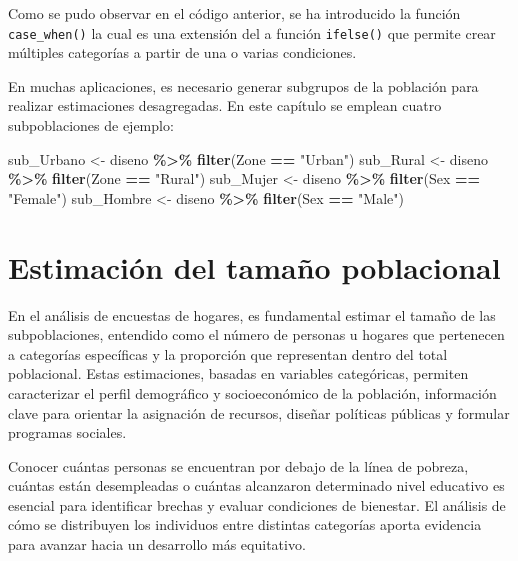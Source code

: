 \documentclass[
  spanish,
  12pt,
]{book}
\newenvironment{Shaded}{\begin{snugshade}}{\end{snugshade}}
\newcommand{\FunctionTok}[1]{\textcolor[rgb]{0.13,0.29,0.53}{\textbf{#1}}}
\newcommand{\NormalTok}[1]{#1}
\newcommand{\OtherTok}[1]{\textcolor[rgb]{0.56,0.35,0.01}{#1}}
\newcommand{\SpecialCharTok}[1]{\textcolor[rgb]{0.81,0.36,0.00}{\textbf{#1}}}
\newcommand{\StringTok}[1]{\textcolor[rgb]{0.31,0.60,0.02}{#1}}
\begin{document}
Como se pudo observar en el código anterior, se ha introducido la función \texttt{case\_when()} la cual es una extensión del a función \texttt{ifelse()} que permite crear múltiples categorías a partir de una o varias condiciones.

En muchas aplicaciones, es necesario generar subgrupos de la población para realizar estimaciones desagregadas. En este capítulo se emplean cuatro subpoblaciones de ejemplo:

\begin{Shaded}
\begin{Highlighting}[]
\NormalTok{sub\_Urbano }\OtherTok{\textless{}{-}}\NormalTok{ diseno }\SpecialCharTok{\%\textgreater{}\%}  \FunctionTok{filter}\NormalTok{(Zone }\SpecialCharTok{==} \StringTok{"Urban"}\NormalTok{)}
\NormalTok{sub\_Rural  }\OtherTok{\textless{}{-}}\NormalTok{ diseno }\SpecialCharTok{\%\textgreater{}\%}  \FunctionTok{filter}\NormalTok{(Zone }\SpecialCharTok{==} \StringTok{"Rural"}\NormalTok{)}
\NormalTok{sub\_Mujer  }\OtherTok{\textless{}{-}}\NormalTok{ diseno }\SpecialCharTok{\%\textgreater{}\%}  \FunctionTok{filter}\NormalTok{(Sex }\SpecialCharTok{==} \StringTok{"Female"}\NormalTok{)}
\NormalTok{sub\_Hombre }\OtherTok{\textless{}{-}}\NormalTok{ diseno }\SpecialCharTok{\%\textgreater{}\%}  \FunctionTok{filter}\NormalTok{(Sex }\SpecialCharTok{==} \StringTok{"Male"}\NormalTok{)}
\end{Highlighting}
\end{Shaded}

\section{Estimación del tamaño poblacional}\label{estimaciuxf3n-del-tamauxf1o-poblacional}

En el análisis de encuestas de hogares, es fundamental estimar el tamaño de las subpoblaciones, entendido como el número de personas u hogares que pertenecen a categorías específicas y la proporción que representan dentro del total poblacional. Estas estimaciones, basadas en variables categóricas, permiten caracterizar el perfil demográfico y socioeconómico de la población, información clave para orientar la asignación de recursos, diseñar políticas públicas y formular programas sociales.

Conocer cuántas personas se encuentran por debajo de la línea de pobreza, cuántas están desempleadas o cuántas alcanzaron determinado nivel educativo es esencial para identificar brechas y evaluar condiciones de bienestar. El análisis de cómo se distribuyen los individuos entre distintas categorías aporta evidencia para avanzar hacia un desarrollo más equitativo.
\end{document}
